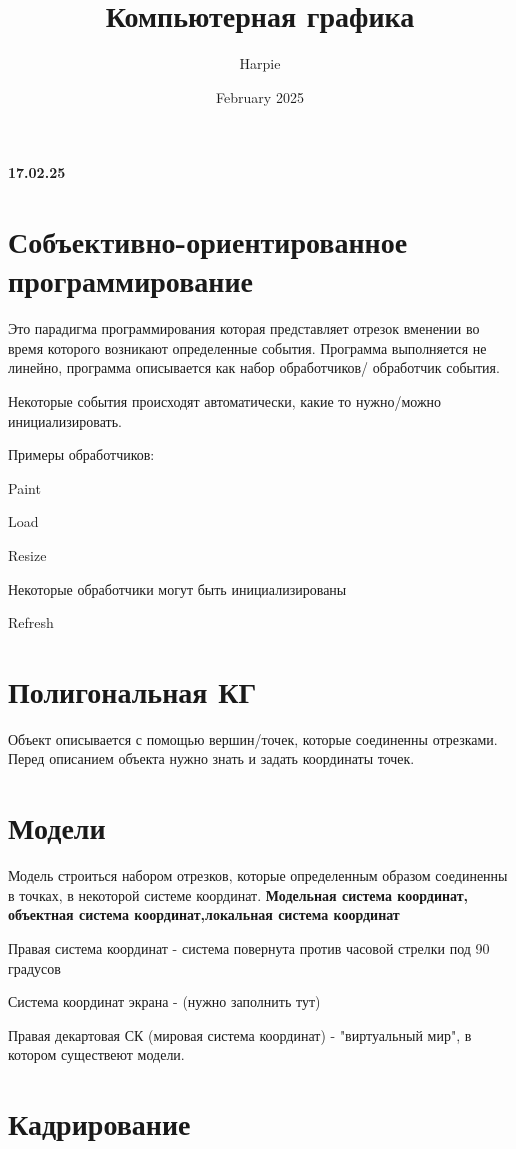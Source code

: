 \documentclass{article}
\title{Компьютерная графика}
\author{Harpie}
\date{February 2025}
\begin{document}
\maketitle

\textbf{17.02.25}

\section{Собъективно-ориентированное программирование}

Это парадигма программирования которая представляет отрезок вменении во время которого возникают определенные события. Программа выполняется не линейно, программа описывается как набор обработчиков/ обработчик события.

Некоторые события происходят автоматически, какие то нужно/можно инициализировать.

Примеры обработчиков:

Paint

Load

Resize

\vspace{5mm}

Некоторые обработчики могут быть инициализированы

Refresh

\section{Полигональная КГ}

Объект описывается с помощью вершин/точек, которые соединенны отрезками. Перед описанием объекта нужно знать и задать координаты точек.

\section{Модели}

Модель строиться набором отрезков, которые определенным образом соединенны в точках, в некоторой системе координат. \textbf{Модельная система координат, объектная система координат,локальная система координат}

Правая система координат - система повернута против часовой стрелки под 90 градусов

Система координат экрана - (нужно заполнить тут) 

Правая декартовая СК (мировая система координат) - "виртуальный мир", в котором существеют модели.

\section{Кадрирование}
\end{document}
